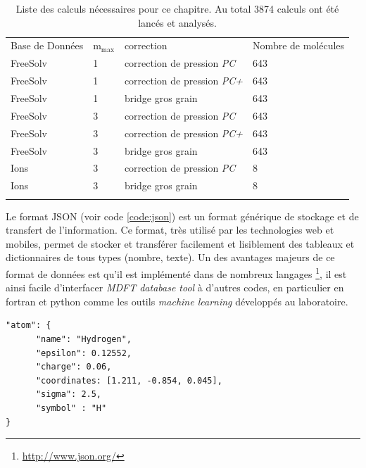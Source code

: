 \begin{table}[ht]
  \begin{tabular}{l l l l}
    \hline & \\[-1em]\hline
    Base de Données & $\mathrm{m}_\mathrm{max}$   & correction & Nombre de molécules \\
    \hline
    FreeSolv  & 1 & correction de pression \textit{PC} & 643 \\
    FreeSolv  & 1 & correction de pression \textit{PC+} & 643 \\
    FreeSolv  & 1 & bridge gros grain & 643 \\
    FreeSolv  & 3 & correction de pression \textit{PC} & 643 \\
    FreeSolv  & 3 & correction de pression \textit{PC+} & 643 \\
    FreeSolv  & 3 & bridge gros grain & 643 \\
    \hline
    Ions  & 3 & correction de pression \textit{PC} & 8 \\
    Ions  & 3 & bridge gros grain & 8 \\
    \hline & \\[-1em]\hline
  \end{tabular}
  \caption[Liste des benchmark lancés.]{Liste des calculs nécessaires pour ce chapitre. Au total 3874 calculs ont été lancés et analysés.}
  \label{tab:calculs_lances}  
\end{table}



Le format JSON (voir code \ref{code:json}) est un format générique de stockage et de transfert de l'information. Ce format, très utilisé par les technologies web et mobiles, permet de stocker et transférer facilement et lisiblement des tableaux et dictionnaires de tous types (nombre, texte). Un des avantages majeurs de ce format de données est qu'il est implémenté dans de nombreux langages \footnote{\url{http://www.json.org/}}, il est ainsi facile d'interfacer \textit{MDFT database tool} à d'autres codes, en particulier en fortran et python comme les outils \textit{machine learning} développés au laboratoire. 


\begin{lstlisting}[caption={Exemple de fichier json. Ici on décrit un atome, son nom, son symbole, sa position ainsi que ses paramètres de champ de force.}, label={code:json},captionpos=b]
  "atom": {
      "name": "Hydrogen", 
      "epsilon": 0.12552, 
      "charge": 0.06, 
      "coordinates: [1.211, -0.854, 0.045],  
      "sigma": 2.5,
      "symbol" : "H"
}
\end{lstlisting}





